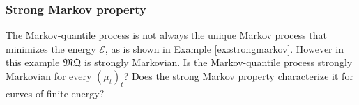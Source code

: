 \documentclass[JEP,XML,SOM,Unicode,NoEqCountersInSection,NoFloatCountersInSection,published]{cedram}
\theoremstyle{plain}
\theoremstyle{definition}
\newcommand{\mq}{\mathfrak{MQ}}
\newcommand{\EE}{{\mathcal E}}
\begin{document}
\subsubsection{Strong Markov property}\label{ss:strong}
The Markov-quantile process is not always the unique Markov process that minimizes the energy $\EE$, as is shown in Example \ref{ex:strongmarkov}. However in this example $\mq$ is strongly Markovian. Is the Markov-quantile process strongly Markovian for every $(\mu_t)_t$? Does the strong Markov property characterize it for curves of finite energy?

\backmatter


\end{document}
